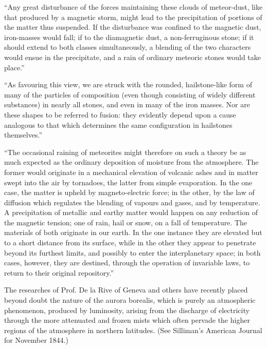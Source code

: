 \documentclass[a4paper, 12pt, oneside]{article}
\begin{document}
``Any great disturbance of the forces maintaining these clouds of meteor-dust, like that produced by a magnetic storm, might lead to the precipitation of portions of the matter thus suspended. If the disturbance was confined to the magnetic dust, iron-masses would fall; if to the diamagnetic dust, a non-ferruginous stone; if it should extend to both classes simultaneously, a blending of the two characters would ensue in the precipitate, and a rain of ordinary meteoric stones would take place.''

``As favouring this view, we are struck with the rounded, hailstone-like form of many of the particles of composition (even though consisting of widely different substances) in nearly all stones, and even in many of the iron masses. Nor are these shapes to be referred to fusion: they evidently depend upon a cause analogous to that which determines the same configuration in hailstones themselves.''

``The occasional raining of meteorites might therefore on such a theory be as much expected as the ordinary deposition of moisture from the atmosphere. The former would originate in a mechanical elevation of volcanic ashes and in matter swept into the air by tornadoes, the latter from simple evaporation. In the one case, the matter is upheld by magneto-electric force; in the other, by the law of diffusion which regulates the blending of vapours and gases, and by temperature. A precipitation of metallic and earthy matter would happen on any reduction of the magnetic tension; one of rain, hail or snow, on a fall of temperature. The materials of both originate in our earth. In the one instance they are elevated but to a short distance from its surface, while in the other they appear to penetrate beyond its furthest limits, and possibly to enter the interplanetary space; in both cases, however, they are destined, through the operation of invariable laws, to return to their original repository.''

The researches of Prof. De la Rive of Geneva and others have recently placed beyond doubt the nature of the aurora borealis, which is purely an atmospheric phenomenon, produced by luminosity, arising from the discharge of electricity through the more attenuated and frozen mists which often pervade the higher regions of the atmosphere in northern latitudes. (See Silliman's American Journal for November 1844.)
\end{document}

